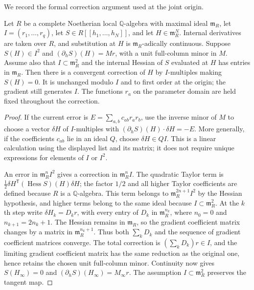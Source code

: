 We record the formal correction argument used at the joint origin.

\begin{lemma}
\label{lem:vertex-correction}
Let $R$ be a complete Noetherian local $\mathbb Q$-algebra with maximal
ideal $\mathfrak m_R$, let $I=(r_1,\ldots,r_q)$, let
$S\in R[[h_1,\ldots,h_N]]$, and let $H\in\mathfrak m_R^N$.
Internal derivatives are taken over $R$, and substitution at $H$ is
$\mathfrak m_R$-adically continuous.  Suppose
$S(H)\in I^2$ and $(\partial_h S)(H)=Mr$, with a unit full-column minor
in $M$.  Assume also that $I\subset\mathfrak m_R^2$ and the internal
Hessian of $S$ evaluated at $H$ has entries in $\mathfrak m_R$.
Then there is a convergent correction of $H$ by $I$-multiples making
$S(H)=0$.  It is unchanged modulo $I$ and to first order at the origin;
the gradient still generates $I$.  The functions $r_a$ on the parameter
domain are held fixed throughout the correction.
\end{lemma}

\begin{proof}
If the current error is $E=\sum_{a,b}c_{ab}r_ar_b$, use the inverse
minor of $M$ to choose a vector $\delta H$ of $I$-multiples with
$(\partial_h S)(H)\cdot\delta H=-E$.  More generally, if the coefficients
$c_{ab}$ lie in an ideal $Q$, choose $\delta H\in QI$.  This is a linear
calculation using the displayed list and its matrix; it does not require
unique expressions for elements of $I$ or $I^2$.

An error in $\mathfrak m_R^n I^2$ gives a
correction in $\mathfrak m_R^n I$.  The quadratic Taylor term is
$\frac12\delta H^{\mathsf T}(\operatorname{Hess}S)(H)\delta H$;
the factor $1/2$ and all higher Taylor coefficients are defined because
$R$ is a $\mathbb Q$-algebra.  This term belongs to
$\mathfrak m_R^{2n+1}I^2$ by the Hessian hypothesis, and higher terms
belong to the same ideal because $I\subset\mathfrak m_R^2$.
At the $k$th step write
$\delta H_k=D_kr$, with every entry of $D_k$ in
$\mathfrak m_R^{n_k}$, where $n_0=0$ and $n_{k+1}=2n_k+1$.
The Hessian remains in $\mathfrak m_R$, so the gradient coefficient
matrix changes by a matrix in $\mathfrak m_R^{n_k+1}$.
Thus both $\sum_kD_k$ and the sequence of gradient coefficient matrices
converge.  The total correction is $(\sum_kD_k)r\in I$, and the limiting
gradient coefficient matrix has the same reduction as the original
one, hence retains the chosen unit full-column minor.  Continuity now
gives $S(H_\infty)=0$ and $(\partial_h S)(H_\infty)=M_\infty r$.  The
assumption $I\subset\mathfrak m_R^2$ preserves the tangent map.

\end{proof}

